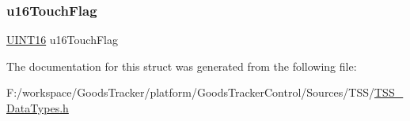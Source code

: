 \subsubsection{\texorpdfstring{u16\+Touch\+Flag}{u16TouchFlag}}
{\footnotesize\ttfamily \hyperlink{_t_s_s___data_types_8h_a09f1a1fb2293e33483cc8d44aefb1eb1}{U\+I\+N\+T16} u16\+Touch\+Flag}



The documentation for this struct was generated from the following file\+:\begin{DoxyCompactItemize}
\item 
F\+:/workspace/\+Goods\+Tracker/platform/\+Goods\+Tracker\+Control/\+Sources/\+T\+S\+S/\hyperlink{_t_s_s___data_types_8h}{T\+S\+S\+\_\+\+Data\+Types.\+h}\end{DoxyCompactItemize}

